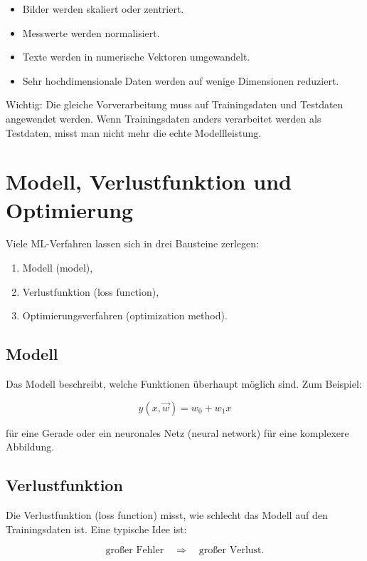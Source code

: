\begin{itemize}
    \item Bilder werden skaliert oder zentriert.
    \item Messwerte werden normalisiert.
    \item Texte werden in numerische Vektoren umgewandelt.
    \item Sehr hochdimensionale Daten werden auf wenige Dimensionen reduziert.
\end{itemize}

\begin{examtipbox}
Wichtig:
Die gleiche Vorverarbeitung muss auf Trainingsdaten und Testdaten angewendet werden.
Wenn Trainingsdaten anders verarbeitet werden als Testdaten, misst man nicht mehr die echte Modellleistung.
\end{examtipbox}

\section{Modell, Verlustfunktion und Optimierung}

Viele ML-Verfahren lassen sich in drei Bausteine zerlegen:

\begin{enumerate}
    \item Modell (model),
    \item Verlustfunktion (loss function),
    \item Optimierungsverfahren (optimization method).
\end{enumerate}

\subsection{Modell}

Das Modell beschreibt, welche Funktionen überhaupt möglich sind.
Zum Beispiel:

\[
    y(x,\vec{w}) = w_0 + w_1x
\]

für eine Gerade oder ein neuronales Netz (neural network) für eine komplexere Abbildung.

\subsection{Verlustfunktion}

Die Verlustfunktion (loss function) misst, wie schlecht das Modell auf den Trainingsdaten ist.
Eine typische Idee ist:

\[
    \text{großer Fehler}
    \quad\Rightarrow\quad
    \text{großer Verlust}.
\]

